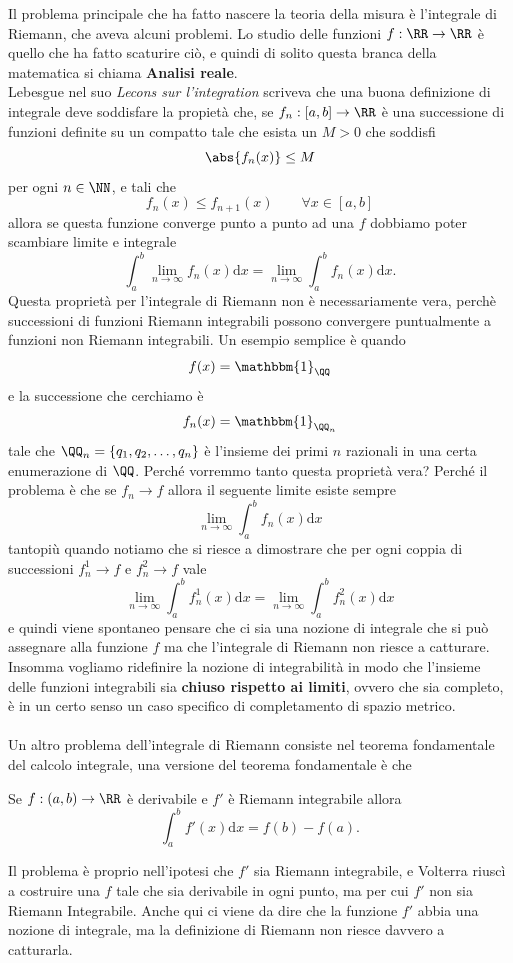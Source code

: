 \documentclass[11pt]{scrartcl}
\newcommand{\dif}{\text{d}}
\begin{document}
	Il problema principale che ha fatto nascere la teoria della misura è l'integrale di Riemann, che aveva alcuni problemi. Lo studio delle funzioni $f:\RR\to\RR$ è quello che ha fatto scaturire ciò, e quindi di solito questa branca della matematica si chiama \textbf{Analisi reale}. \\
	Lebesgue nel suo \textit{Lecons sur l'integration} scriveva che una buona definizione di integrale deve soddisfare la propietà che, se $f_n:[a,b]\to\RR$ è una successione di funzioni definite su un compatto tale che esista un $M>0$ che soddisfi
	$$\abs{f_n(x)}\le M$$
	per ogni $n\in\NN$, e tali che
	$$f_n(x)\le f_{n+1}(x) \qquad \forall x\in [a,b]$$
	allora se questa funzione converge punto a punto ad una $f$ dobbiamo poter scambiare limite e integrale 
	$$\int_a^b\lim_{n\to\infty}f_n(x)\dif x=\lim_{n\to\infty}\int_a^bf_n(x)\dif x.$$
	Questa proprietà per l'integrale di Riemann non è necessariamente vera, perchè successioni di funzioni Riemann integrabili possono convergere puntualmente a funzioni non Riemann integrabili. Un esempio semplice è quando 
	$$f(x)=\mathbbm{1}_\QQ$$
	e la successione che cerchiamo è
	$$f_n(x)=\mathbbm{1}_{\QQ_n}$$
	tale che $\QQ_n=\left\{q_1,q_2,\dots,q_n\right\}$ è l'insieme dei primi $n$ razionali in una certa enumerazione di $\QQ$. Perché vorremmo tanto questa proprietà vera? Perché il problema è che se $f_n\to f$ allora il seguente limite esiste sempre
	$$\lim_{n\to\infty}\int_a^b f_n(x)\dif x$$
	tantopiù quando notiamo che si riesce a dimostrare che per ogni coppia di successioni $f^1_n\to f$ e $f^2_n\to f$ vale 
	$$\lim_{n\to\infty}\int_a^bf^1_n(x)\dif x=\lim_{n\to\infty}\int_a^b f^2_n(x)\dif x$$
	e quindi viene spontaneo pensare che ci sia una nozione di integrale che si può assegnare alla funzione $f$ ma che l'integrale di Riemann non riesce a catturare. Insomma vogliamo ridefinire la nozione di integrabilità in modo che l'insieme delle funzioni integrabili sia \textbf{chiuso rispetto ai limiti}, ovvero che sia completo, è in un certo senso un caso specifico di completamento di spazio metrico. \\
	\\
	Un altro problema dell'integrale di Riemann consiste nel teorema fondamentale del calcolo integrale, una versione del teorema fondamentale è che
	\begin{theorem*}
		Se $f:(a,b)\to\RR$ è derivabile e $f'$ è Riemann integrabile allora 
		$$\int_a^bf'(x)\dif x=f(b)-f(a).$$
	\end{theorem*}
	Il problema è proprio nell'ipotesi che $f'$ sia Riemann integrabile, e Volterra riuscì a costruire una $f$ tale che sia derivabile in ogni punto, ma per cui $f'$ non sia Riemann Integrabile. Anche qui ci viene da dire che la funzione $f'$ abbia una nozione di integrale, ma la definizione di Riemann non riesce davvero a catturarla.
	
\end{document}
